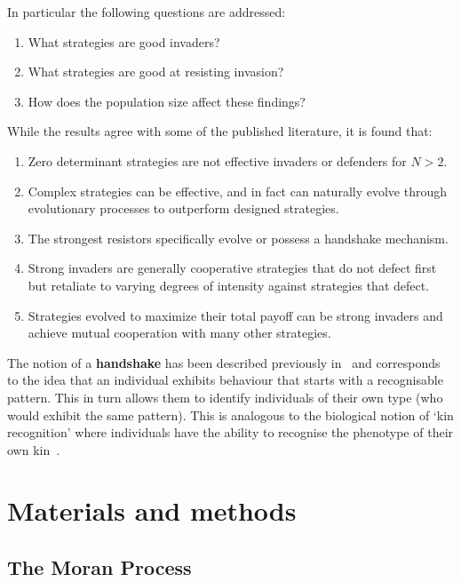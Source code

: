 \documentclass[10pt,letterpaper]{article}
\begin{document}
In particular the following questions are addressed:
\begin{enumerate}
    \item What strategies are good invaders?
    \item What strategies are good at resisting invasion?
    \item How does the population size affect these findings?
\end{enumerate}

While the results agree with some of the published literature, it is found that:

\begin{enumerate}
 \item Zero determinant strategies are not effective invaders or defenders for $N > 2$.
 \item Complex strategies can be effective, and in fact can naturally evolve
     through evolutionary processes to outperform designed strategies.
 \item The strongest resistors specifically evolve or possess a handshake
     mechanism.
 \item Strong invaders are generally cooperative strategies that do not defect
 first but retaliate to varying degrees of intensity against strategies that defect.
 \item Strategies evolved to maximize their total payoff can be strong invaders
 and achieve mutual cooperation with many other strategies.
\end{enumerate}

The notion of a \textbf{handshake} has been described previously
in~\cite{Robson1990} and corresponds to the idea that an individual exhibits
behaviour that starts with a recognisable pattern. This in turn allows them to
identify individuals of their own type (who would exhibit the same pattern).
This is analogous to the biological notion of `kin recognition' where
individuals have the ability to recognise the phenotype of their own
kin~\cite{Mateo2003}.

\section*{Materials and methods}
\subsection*{The Moran Process}
\end{document}
